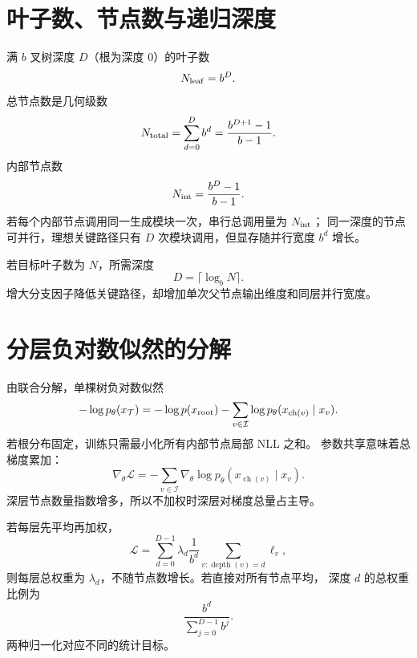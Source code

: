 \documentclass[11pt]{article}
\numberwithin{equation}{section}
\newcommand{\1}{\mathbf{1}}
\newcommand{\cL}{\mathcal{L}}
\begin{document}
\section{叶子数、节点数与递归深度}

满 $b$ 叉树深度 $D$（根为深度 $0$）的叶子数
\begin{equation}
 N_{\rm leaf}=b^D.
\end{equation}
总节点数是几何级数
\begin{equation}
 N_{\rm total}=\sum_{d=0}^{D}b^d
 =\frac{b^{D+1}-1}{b-1}.
\end{equation}
内部节点数
\begin{equation}
 N_{\rm int}=\frac{b^D-1}{b-1}.
\end{equation}
若每个内部节点调用同一生成模块一次，串行总调用量为 $N_{\rm int}$；
同一深度的节点可并行，理想关键路径只有 $D$ 次模块调用，但显存随并行宽度 $b^d$ 增长。

若目标叶子数为 $N$，所需深度
\begin{equation}
 D=\lceil\log_bN\rceil.
\end{equation}
增大分支因子降低关键路径，却增加单次父节点输出维度和同层并行宽度。

\section{分层负对数似然的分解}

由联合分解，单棵树负对数似然
\begin{equation}
 -\log p_\theta(x_{\mathcal T})
 =-\log p(x_{\rm root})
 -\sum_{v\in\mathcal I}
 \log p_\theta(x_{\operatorname{ch}(v)}\mid x_v).
\end{equation}
若根分布固定，训练只需最小化所有内部节点局部 NLL 之和。
参数共享意味着总梯度累加：
\begin{equation}
 \nabla_\theta\cL=
 -\sum_{v\in\mathcal I}
 \nabla_\theta\log p_\theta(x_{\operatorname{ch}(v)}\mid x_v).
\end{equation}
深层节点数量指数增多，所以不加权时深层对梯度总量占主导。

若每层先平均再加权，
\begin{equation}
 \cL=\sum_{d=0}^{D-1}\lambda_d
 \frac1{b^d}\sum_{v:\operatorname{depth}(v)=d}\ell_v,
\end{equation}
则每层总权重为 $\lambda_d$，不随节点数增长。若直接对所有节点平均，
深度 $d$ 的总权重比例为
\begin{equation}
 \frac{b^d}{\sum_{j=0}^{D-1}b^j}.
\end{equation}
两种归一化对应不同的统计目标。
\end{document}
